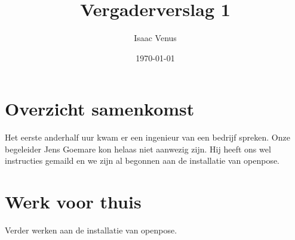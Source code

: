\documentclass[a4paper,kulak]{kulakarticle} %
\date{\today}
\title{Vergaderverslag 1}
\author{Isaac Venus}
\begin{document}
\maketitle
\section{Overzicht samenkomst}
	Het eerste anderhalf uur kwam er een ingenieur van een bedrijf spreken. Onze begeleider Jens Goemare kon helaas niet aanwezig zijn. Hij heeft ons wel instructies gemaild en we zijn al begonnen aan de installatie van openpose.

\section{Werk voor thuis}
	Verder werken aan de installatie van openpose.
\end{document}
